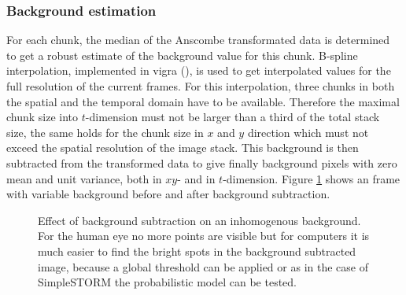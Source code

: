 \subsubsection{Background estimation} \label{bgestimation}
For each chunk, the median of the Anscombe transformated data is determined to get a robust estimate of the background value for this chunk. 
B-spline interpolation, implemented in vigra (\cite{vigra}), is used to get interpolated values for the full resolution of the current frames. For this interpolation, three chunks in both the spatial and the temporal domain have to be available. Therefore the maximal chunk size into $t$-dimension must not be larger than a third of the total stack size, the same holds for the chunk size in $x$ and $y$ direction which must not exceed the spatial resolution of the image stack.\newline
This background is then subtracted from the transformed data to give finally background pixels with zero mean and unit variance, both in $xy$- and in $t$-dimension. Figure \ref{removedBG} shows an frame with variable background before and after background subtraction.
\begin{figure}
\hfill
{}
	\caption{Effect of background subtraction on an inhomogenous background. For the human eye no more points are visible but for computers it is much easier to find the bright spots in the background subtracted image, because a global threshold can be applied or as in the case of SimpleSTORM the probabilistic model can be tested.}
	\label{removedBG}	
\end{figure}
